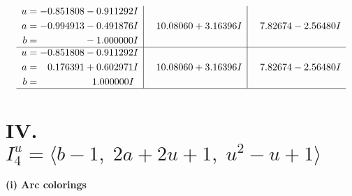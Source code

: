 \documentclass[1p]{elsarticle_modified}
\theoremstyle{definition}
\begin{document}
$$\begin{array}{c|c|c}
\begin{aligned}
u &= -0.851808 - 0.911292 I \\
a &= -0.994913 - 0.491876 I \\
b &= \phantom{-0.000000 } -1.000000 I\end{aligned}
 & \phantom{-}10.08060 + 3.16396 I & \phantom{-}7.82674 - 2.56480 I \\ \hline\begin{aligned}
u &= -0.851808 - 0.911292 I \\
a &= \phantom{-}0.176391 + 0.602971 I \\
b &= \phantom{-0.000000 -}1.000000 I\end{aligned}
 & \phantom{-}10.08060 + 3.16396 I & \phantom{-}7.82674 - 2.56480 I\\
 \hline 
 \end{array}$$\newpage\newpage\renewcommand{\arraystretch}{1}
\centering \section*{IV. $I^u_{4}= \langle b-1,\;2 a+2 u+1,\;u^2- u+1 \rangle$}
\flushleft \textbf{(i) Arc colorings}\\
\end{document}
